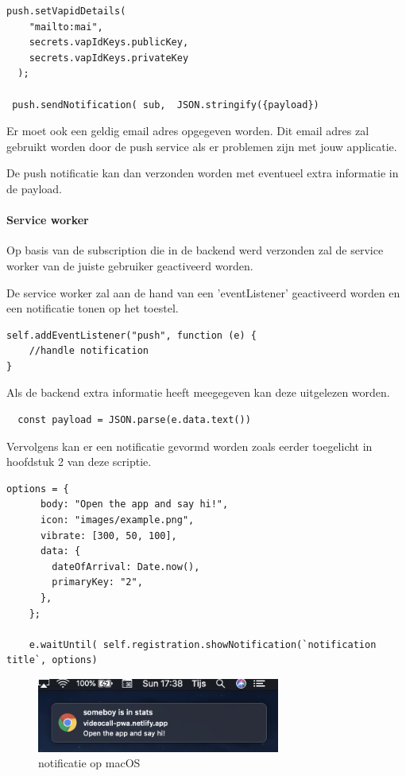 \begin{lstlisting}
push.setVapidDetails(
    "mailto:mai",
    secrets.vapIdKeys.publicKey,
    secrets.vapIdKeys.privateKey
  );
  
 push.sendNotification( sub,  JSON.stringify({payload})
\end{lstlisting}

			Er moet ook een geldig email adres opgegeven worden. Dit email adres zal gebruikt worden door de push service als er problemen zijn met jouw applicatie.
			
			De push notificatie kan dan verzonden worden met eventueel extra informatie in de payload.
			
		\paragraph{Service worker}
		
			Op basis van de subscription die in de backend werd verzonden zal de service worker van de juiste gebruiker geactiveerd worden.
			
			De service worker zal aan de hand van een 'eventListener' geactiveerd worden en een notificatie tonen op het toestel.
			
			
\begin{lstlisting}
self.addEventListener("push", function (e) {
	//handle notification
}
\end{lstlisting}
			
			Als de backend extra informatie heeft meegegeven kan deze uitgelezen worden.
\begin{lstlisting}
  const payload = JSON.parse(e.data.text())
\end{lstlisting}
			
			Vervolgens kan er een notificatie gevormd worden zoals eerder toegelicht in hoofdstuk 2 van deze scriptie.
			
\begin{lstlisting}
options = {
      body: "Open the app and say hi!",
      icon: "images/example.png",
      vibrate: [300, 50, 100],
      data: {
        dateOfArrival: Date.now(),
        primaryKey: "2",
      },
    };

    e.waitUntil( self.registration.showNotification(`notification title`, options)
\end{lstlisting}

	\begin{figure}[H]
		\centering
				\includegraphics[width=80mm]{./img/notificationMacOs}{}		
		\caption{notificatie op macOS}
	\end{figure}
			
